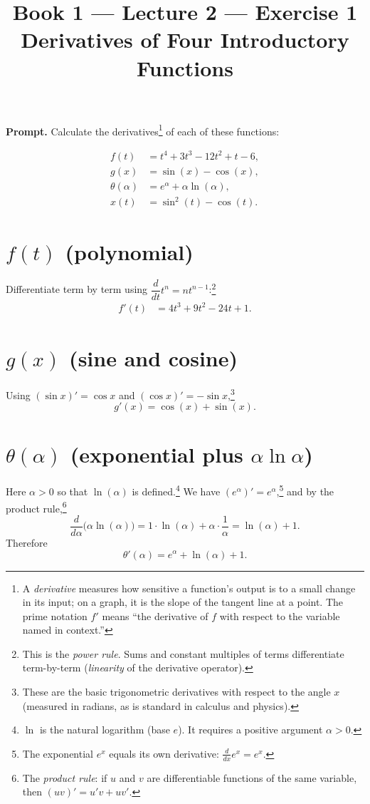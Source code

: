 \documentclass[11pt]{article}
\title{\textbf{Book 1 --- Lecture 2 --- Exercise 1}\\[2mm]
\large Derivatives of Four Introductory Functions}
\author{}
\date{}
\newcommand{\promptbox}[1]{%
  \begin{savenotes}%
  \begingroup\setlength{\fboxsep}{10pt}\noindent
  \colorbox{blue!8}{\parbox{\dimexpr\linewidth-2\fboxsep\relax}{\textbf{Prompt. }#1}}
  \endgroup
  \end{savenotes}%
}
\begin{document}
\maketitle

\promptbox{Calculate the derivatives\footnote{A \emph{derivative} measures how
sensitive a function's output is to a small change in its input; on a graph, it is
the slope of the tangent line at a point. The prime notation \(f'\) means ``the
derivative of \(f\) with respect to the variable named in context.''} of each of
these functions:}
\[
\begin{aligned}
f(t) &= t^4 + 3t^3 - 12t^2 + t - 6, \\
g(x) &= \sin(x) - \cos(x), \\
\theta(\alpha) &= e^\alpha + \alpha\ln(\alpha), \\
x(t) &= \sin^2(t) - \cos(t).
\end{aligned}
\]

\section*{\(f(t)\) (polynomial)}
Differentiate term by term using \(\dfrac{d}{dt}t^n = n t^{n-1}\):\footnote{This
is the \emph{power rule}. Sums and constant multiples of terms differentiate
term-by-term (\emph{linearity} of the derivative operator).}
\[
\begin{aligned}
f'(t) &= 4t^3 + 9t^2 - 24t + 1.
\end{aligned}
\]

\section*{\(g(x)\) (sine and cosine)}
Using \((\sin x)'=\cos x\) and \((\cos x)'=-\sin x\),\footnote{These are the basic
trigonometric derivatives with respect to the angle \(x\) (measured in radians,
as is standard in calculus and physics).}
\[
g'(x) = \cos(x) + \sin(x).
\]

\section*{\(\theta(\alpha)\) (exponential plus \(\alpha\ln\alpha\))}
Here \(\alpha>0\) so that \(\ln(\alpha)\) is defined.\footnote{\(\ln\) is the
natural logarithm (base \(e\)). It requires a positive argument \(\alpha>0\).}
We have \((e^\alpha)'=e^\alpha\),\footnote{The exponential \(e^x\) equals its own
derivative: \(\frac{d}{dx}e^x=e^x\).} and by the product rule,\footnote{The
\emph{product rule}: if \(u\) and \(v\) are differentiable functions of the same
variable, then \((uv)'=u'v+uv'\).}
\[
\frac{d}{d\alpha}\bigl(\alpha\ln(\alpha)\bigr)
= 1\cdot\ln(\alpha) + \alpha\cdot\frac{1}{\alpha}
= \ln(\alpha) + 1.
\]
Therefore
\[
\theta'(\alpha) = e^\alpha + \ln(\alpha) + 1.
\]
\end{document}
